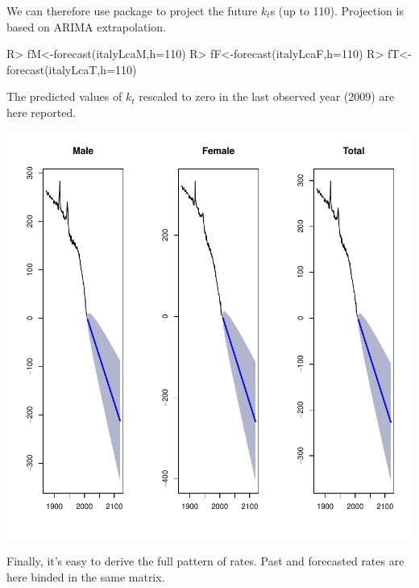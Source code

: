 \documentclass[nojss]{jss}
\begin{document}
We can therefore use  package to project the future $k_{t}$s (up to 110). Projection is based on ARIMA extrapolation.

\begin{Schunk}
\begin{Sinput}
R> fM<-forecast(italyLcaM,h=110)
R> fF<-forecast(italyLcaF,h=110)
R> fT<-forecast(italyLcaT,h=110)
\end{Sinput}
\end{Schunk}

The predicted values of $k_{t}$ rescaled to zero in the last observed year (2009) are here reported.

\begin{Schunk}
\end{Schunk}
\includegraphics{mortality_projection-ktProjectionFig}

Finally, it's easy to derive the full pattern of rates. Past and forecasted rates are here binded in the same matrix.
\end{document}
